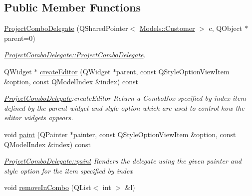 \subsection*{Public Member Functions}
\begin{DoxyCompactItemize}
\item 
\hyperlink{classGui_1_1Widgets_1_1Delegates_1_1ProjectComboDelegate_a5fda87c3db87a0928717810a0ac2812f}{Project\-Combo\-Delegate} (Q\-Shared\-Pointer$<$ \hyperlink{classModels_1_1Customer}{Models\-::\-Customer} $>$ c, Q\-Object $\ast$parent=0)
\begin{DoxyCompactList}\small\item\em \hyperlink{classGui_1_1Widgets_1_1Delegates_1_1ProjectComboDelegate_a5fda87c3db87a0928717810a0ac2812f}{Project\-Combo\-Delegate\-::\-Project\-Combo\-Delegate}. \end{DoxyCompactList}\item 
Q\-Widget $\ast$ \hyperlink{classGui_1_1Widgets_1_1Delegates_1_1ProjectComboDelegate_adbfc28a3e6de34dc63d7290ae5b5c053}{create\-Editor} (Q\-Widget $\ast$parent, const Q\-Style\-Option\-View\-Item \&option, const Q\-Model\-Index \&index) const 
\begin{DoxyCompactList}\small\item\em \hyperlink{classGui_1_1Widgets_1_1Delegates_1_1ProjectComboDelegate}{Project\-Combo\-Delegate}\-:create\-Editor Return a Combo\-Box specified by {\itshape index} item defined by the {\itshape parent} widget and style {\itshape option} which are used to control how the editor widgets appears. \end{DoxyCompactList}\item 
void \hyperlink{classGui_1_1Widgets_1_1Delegates_1_1ProjectComboDelegate_a20cbc84d26b83083fdf7efecae3407cf}{paint} (Q\-Painter $\ast$painter, const Q\-Style\-Option\-View\-Item \&option, const Q\-Model\-Index \&index) const 
\begin{DoxyCompactList}\small\item\em \hyperlink{classGui_1_1Widgets_1_1Delegates_1_1ProjectComboDelegate_a20cbc84d26b83083fdf7efecae3407cf}{Project\-Combo\-Delegate\-::paint} Renders the delegate using the given {\itshape painter} and style {\itshape option} for the item specified by {\itshape index} \end{DoxyCompactList}\item 
\hypertarget{classGui_1_1Widgets_1_1Delegates_1_1ProjectComboDelegate_a2c063b4b737ff627696a1b247860cc4b}{void \hyperlink{classGui_1_1Widgets_1_1Delegates_1_1ProjectComboDelegate_a2c063b4b737ff627696a1b247860cc4b}{remove\-In\-Combo} (Q\-List$<$ int $>$ \&l)}\label{classGui_1_1Widgets_1_1Delegates_1_1ProjectComboDelegate_a2c063b4b737ff627696a1b247860cc4b}


\end{DoxyCompactItemize}
